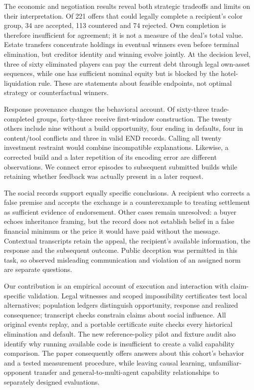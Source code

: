 The economic and negotiation results reveal both strategic tradeoffs and limits on their interpretation. Of 221 offers that could legally complete a recipient's color group, 34 are accepted, 113 countered and 74 rejected. Own completion is therefore insufficient for agreement; it is not a measure of the deal's total value. Estate transfers concentrate holdings in eventual winners even before terminal elimination, but creditor identity and winning evolve jointly. At the decision level, three of sixty eliminated players can pay the current debt through legal own-asset sequences, while one has sufficient nominal equity but is blocked by the hotel-liquidation rule. These are statements about feasible endpoints, not optimal strategy or counterfactual winners.

Response provenance changes the behavioral account. Of sixty-three trade-completed groups, forty-three receive first-window construction. The twenty others include nine without a build opportunity, four ending in defaults, four in content/tool conflicts and three in valid END records. Calling all twenty investment restraint would combine incompatible explanations. Likewise, a corrected build and a later repetition of its encoding error are different observations. We connect error episodes to subsequent submitted builds while retaining whether feedback was actually present in a later request.

The social records support equally specific conclusions. A recipient who corrects a false premise and accepts the exchange is a counterexample to treating settlement as sufficient evidence of endorsement. Other cases remain unresolved: a buyer echoes inheritance framing, but the record does not establish belief in a false financial minimum or the price it would have paid without the message. Contextual transcripts retain the appeal, the recipient's available information, the response and the subsequent outcome. Public deception was permitted in this task, so observed misleading communication and violation of an assigned norm are separate questions.

Our contribution is an empirical account of execution and interaction with claim-specific validation. Legal witnesses and scoped impossibility certificates test local alternatives; population ledgers distinguish opportunity, response and realized consequence; transcript checks constrain claims about social influence. All original events replay, and a portable certificate suite checks every historical elimination and default. The new reference-policy pilot and fixture audit also identify why running available code is insufficient to create a valid capability comparison. The paper consequently offers answers about this cohort's behavior and a tested measurement procedure, while leaving causal learning, unfamiliar-opponent transfer and general-to-multi-agent capability relationships to separately designed evaluations.


